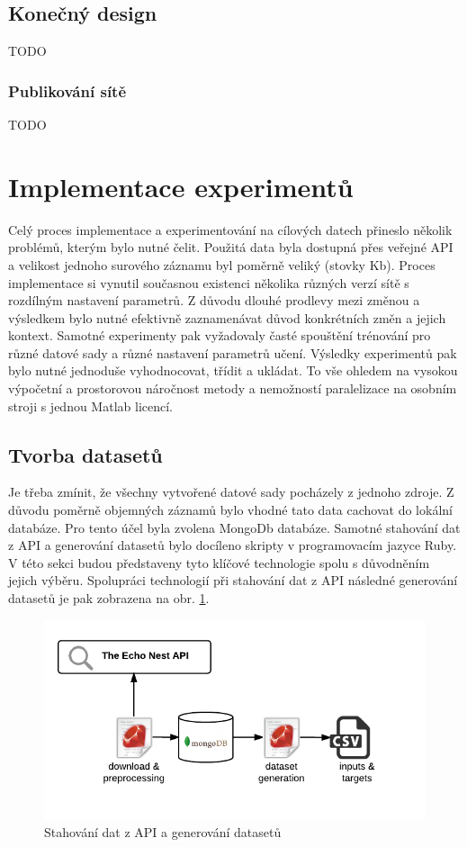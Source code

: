 \documentclass[thesis=M,czech]{FITthesis}[2012/06/26]
\begin{document}
\subsection{Konečný design}
TODO

\subsubsection{Publikování sítě}
TODO

\section{Implementace experimentů}

Celý proces implementace a experimentování na cílových datech přineslo několik problémů, kterým bylo nutné čelit. 
Použitá data byla dostupná přes veřejné API a velikost jednoho surového záznamu byl poměrně veliký (stovky Kb).
Proces implementace si vynutil současnou existenci několika různých verzí sítě s rozdílným nastavení  parametrů. Z důvodu dlouhé prodlevy mezi změnou a výsledkem bylo nutné efektivně zaznamenávat důvod konkrétních změn a jejich kontext.
Samotné experimenty pak vyžadovaly časté spouštění trénování pro různé datové sady a různé nastavení parametrů učení. Výsledky experimentů pak bylo nutné jednoduše vyhodnocovat, třídit a ukládat. To vše ohledem na vysokou výpočetní a prostorovou náročnost metody a nemožností paralelizace na osobním stroji s jednou Matlab licencí. 


\subsection{Tvorba datasetů}

Je třeba zmínit, že všechny vytvořené datové sady pocházely z jednoho zdroje. Z důvodu poměrně objemných záznamů bylo vhodné tato data cachovat do lokální databáze. Pro tento účel byla zvolena MongoDb databáze. Samotné stahování dat z API a generování datasetů bylo docíleno skripty v programovacím jazyce Ruby. V této sekci budou představeny tyto klíčové technologie spolu s důvodněním jejich výběru. Spolupráci technologií při stahování dat z API následné generování datasetů je pak zobrazena na obr. \ref{fig:down}.

\begin{figure}[htbp]
\begin{center}
	\includegraphics[scale=1]{download_generate.png}
\caption{Stahování dat z API a generování datasetů}
\label{fig:down}
\end{center}
\end{figure}
\end{document}
